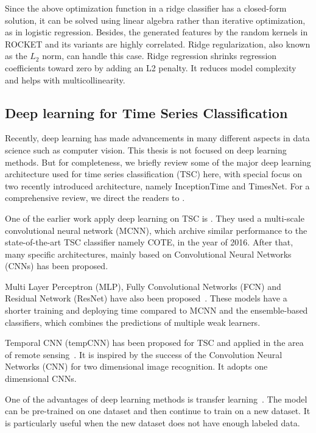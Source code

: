 Since the above optimization function in a ridge classifier has a closed-form solution, it can be solved using linear algebra rather than iterative optimization, as in logistic regression.
Besides, the generated features by the random kernels in ROCKET and its variants are highly correlated. Ridge regularization, also known as the $L_2$ norm, can handle this case.
Ridge regression shrinks regression coefficients toward zero by adding an L2 penalty.
It reduces model complexity and helps with multicollinearity.

\subsection{Deep learning for Time Series Classification} %

Recently, deep learning has made advancements in many different aspects in data science such as computer vision.
This thesis is not focused on deep learning methods. But for completeness, we briefly review some of the major deep learning architecture used for time series classification (TSC) here, with special focus on two recently introduced architecture, namely InceptionTime and TimesNet.
For a comprehensive review, we direct the readers to \cite{ismailfawaz2019deepa}.

One of the earlier work apply deep learning on TSC is \cite{cui2016multiscalea}. 
They used a multi-scale convolutional neural network (MCNN), which archive similar performance to the state-of-the-art TSC classifier namely COTE, in the year of 2016.
After that, many specific architectures, mainly based on Convolutional Neural Networks (CNNs) has been proposed.

Multi Layer Perceptron (MLP), Fully Convolutional Networks (FCN) and Residual Network (ResNet) have also been proposed~\cite{wang2017time}.
These models have a shorter training and deploying time compared to MCNN and the ensemble-based classifiers, which combines the predictions of multiple weak learners.

Temporal CNN (tempCNN) has been proposed for TSC and applied in the area of remote sensing~\cite{pelletier2019temporal}.
It is inspired by the success of the Convolution Neural Networks (CNN) for two dimensional image recognition. It adopts one dimensional CNNs.

One of the advantages of deep learning methods is transfer learning~\cite{yosinski2014how}.
The model can be pre-trained on one dataset and then continue to train on a new dataset.
It is particularly useful when the new dataset does not have enough labeled data.

